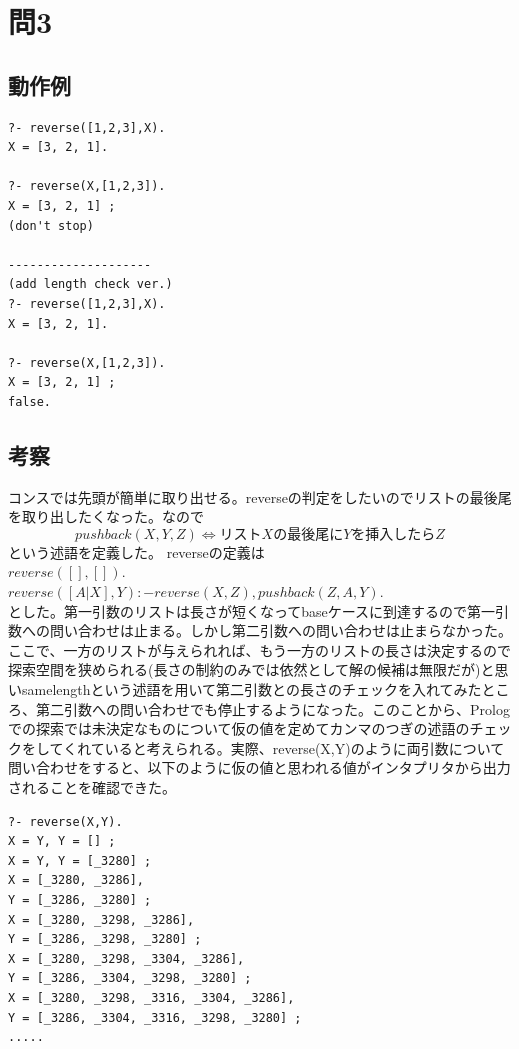 \documentclass[11pt,a4paper]{jsarticle}
\begin{document}
\section*{問3}
\subsection*{動作例}
\begin{lstlisting}[basicstyle=\ttfamily\footnotesize, frame=single]
?- reverse([1,2,3],X).
X = [3, 2, 1].

?- reverse(X,[1,2,3]).
X = [3, 2, 1] ;
(don't stop)

--------------------
(add length check ver.)
?- reverse([1,2,3],X).
X = [3, 2, 1].

?- reverse(X,[1,2,3]).
X = [3, 2, 1] ;
false.
\end{lstlisting}
\subsection*{考察}
コンスでは先頭が簡単に取り出せる。reverseの判定をしたいのでリストの最後尾を取り出したくなった。なので
$$pushback(X,Y,Z)\Leftrightarrow リストXの最後尾にYを挿入したらZ$$
という述語を定義した。
reverseの定義は\\
$reverse([],[]).$\\
$reverse([A|X],Y) :- reverse(X,Z),pushback(Z,A,Y).$\\
とした。第一引数のリストは長さが短くなってbaseケースに到達するので第一引数への問い合わせは止まる。しかし第二引数への問い合わせは止まらなかった。
ここで、一方のリストが与えられれば、もう一方のリストの長さは決定するので探索空間を狭められる(長さの制約のみでは依然として解の候補は無限だが)と思いsamelengthという述語を用いて第二引数との長さのチェックを入れてみたところ、第二引数への問い合わせでも停止するようになった。このことから、Prologでの探索では未決定なものについて仮の値を定めてカンマのつぎの述語のチェックをしてくれていると考えられる。実際、reverse(X,Y)のように両引数について問い合わせをすると、以下のように仮の値と思われる値がインタプリタから出力されることを確認できた。
\begin{lstlisting}[basicstyle=\ttfamily\footnotesize, frame=single]
?- reverse(X,Y).
X = Y, Y = [] ;
X = Y, Y = [_3280] ;
X = [_3280, _3286],
Y = [_3286, _3280] ;
X = [_3280, _3298, _3286],
Y = [_3286, _3298, _3280] ;
X = [_3280, _3298, _3304, _3286],
Y = [_3286, _3304, _3298, _3280] ;
X = [_3280, _3298, _3316, _3304, _3286],
Y = [_3286, _3304, _3316, _3298, _3280] ;
.....
\end{lstlisting}
\end{document}
